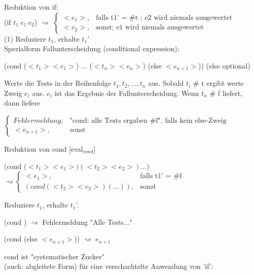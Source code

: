 \documentclass[a4paper, 20pt, openany]{book}
\begin{document}
Reduktion von if: \\

(if $t_{1}\  e_{1}  \ e_{2}$) $ \rightsquigarrow$ 
$ \left\{\begin{array}{cl} <e_{1}>, & \mbox{falls t1' = \#t ; e2 wird niemals ausgewertet} \\ <e_{2}>, & \mbox{sonst; e1 wird niemals ausgewertet} \end{array}\right. $ \\



(1) Reduziere $t_{1}$, erhalte $t_{1}'$ \\

Spezialform Fallunterscheidung (conditional expression):
\begin{center}
(cond ($<t_1 > <e_1 >$) ... ($<t_n > <e_n >$) (else $<e_{n+1}>$)) (else optional)
\end{center}

Werte die Tests in der Reihenfolge $t_{1},t_{2},...,t_{n}$ aus. Sobald $t_i $ \# t ergibt werte Zweig $e_i $ aus. $e_i $ ist das Ergebnis der Fallunterscheidung. Wenn $t_n $ \# f liefert, dann liefere
\begin{center}
$ \left\{\begin{array}{cl} Fehlermeldung, & \mbox{"cond: alle Tests ergaben \#f", falls kein else-Zweig \ } \\ <e_{n+1}>, & \mbox{sonst} \end{array}\right. $
\end{center}

Reduktion von cond [eval$_{cond}$]

\begin{center}
	(cond ($<t_{1}> <e_{1}>) (<t_2> <e_2>) ...$) $\rightsquigarrow    \left\{\begin{array}{cl} <e_{1}>, & \mbox{falls t1' = \#f} \\ (cond (<t_{2}> <e_{2}> ) (...) ), & \mbox{sonst} \end{array}\right. $
\end{center}

Reduziere $t_1$, erhalte $t_1$'.

(cond ) $\rightsquigarrow$ Fehlermeldung "Alle Tests..."

(cond (else $<e_{n+1}>$)) $\rightsquigarrow$ $e_{n+1}$

cond ist "systematischer Zucker" \\
(auch: abgleitete Form) für eine verschachtelte Anwendung von 'if':
\end{document}
